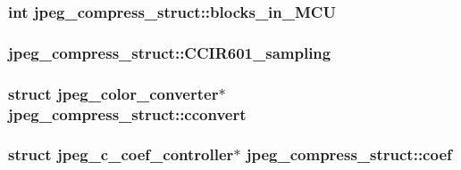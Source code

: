 \subsubsection[{blocks\+\_\+in\+\_\+\+M\+C\+U}]{\setlength{\rightskip}{0pt plus 5cm}int jpeg\+\_\+compress\+\_\+struct\+::blocks\+\_\+in\+\_\+\+M\+C\+U}\label{structjpeg__compress__struct_ac32cf016a916984f68f158e5310a16bb}
\hypertarget{structjpeg__compress__struct_abf474ed47e9f0a9c066bc47de5b0e8e7}{}
\subsubsection[{C\+C\+I\+R601\+\_\+sampling}]{ jpeg\+\_\+compress\+\_\+struct\+::\+C\+C\+I\+R601\+\_\+sampling}\label{structjpeg__compress__struct_abf474ed47e9f0a9c066bc47de5b0e8e7}
\hypertarget{structjpeg__compress__struct_a7c51e665f18d6e5a0fed053c470f4914}{}
\subsubsection[{cconvert}]{\setlength{\rightskip}{0pt plus 5cm}struct {\bf jpeg\+\_\+color\+\_\+converter}$\ast$ jpeg\+\_\+compress\+\_\+struct\+::cconvert}\label{structjpeg__compress__struct_a7c51e665f18d6e5a0fed053c470f4914}
\hypertarget{structjpeg__compress__struct_ad54865b66c30ce332c6757d56393dedc}{}
\subsubsection[{coef}]{\setlength{\rightskip}{0pt plus 5cm}struct {\bf jpeg\+\_\+c\+\_\+coef\+\_\+controller}$\ast$ jpeg\+\_\+compress\+\_\+struct\+::coef}\label{structjpeg__compress__struct_ad54865b66c30ce332c6757d56393dedc}
\hypertarget{structjpeg__compress__struct_a3533c65068c4cec8f048019d2b1c0557}{}
